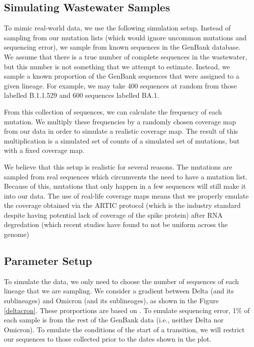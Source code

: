 \documentclass{article}
\begin{document}
\subsection{Simulating Wastewater Samples}

To mimic real-world data, we use the following simulation setup.
Instead of sampling from our mutation lists (which would ignore uncommon mutations and sequencing error), we sample from known sequences in the GenBank database.
We assume that there is a true number of complete sequences in the wastewater, but this number is not something that we attempt to estimate.
Instead, we sample a known proportion of the GenBank sequences that were assigned to a given lineage.
For example, we may take 400 sequences at random from those labelled B.1.1.529 and 600 sequences labelled BA.1.

From this collection of sequences, we can calculate the frequency of each mutation.
We multiply these frequencies by a randomly chosen coverage map from our data in order to simulate a realistic coverage map.
The result of this multiplication is a simulated set of counts of a simulated set of mutations, but with a fixed coverage map.

We believe that this setup is realistic for several reasons.
The mutations are sampled from real sequences which circumvents the need to have a mutation list.
Because of this, mutations that only happen in a few sequences will still make it into our data.
The use of real-life coverage maps means that we properly emulate the coverage obtained via the ARTIC protocol (which is the industry standard despite having potential lack of coverage of the spike protein) after RNA degredation (which recent studies have found to not be uniform across the genome) 

\subsection{Parameter Setup}

To simulate the data, we only need to choose the number of sequences of each lineage that we are sampling.
We consider a gradient between Delta (and its sublineages) and Omicron (and its sublineages), as shown in the Figure \ref{deltacron}.
These prorportions are based on \cite{David's invasion paper}.
To emulate sequencing error, 1\% of each sample is from the rest of the GenBank data (i.e., neither Delta nor Omicron).
To emulate the conditions of the start of a transition, we will restrict our sequences to those collected prior to the dates shown in the plot.
\end{document}
